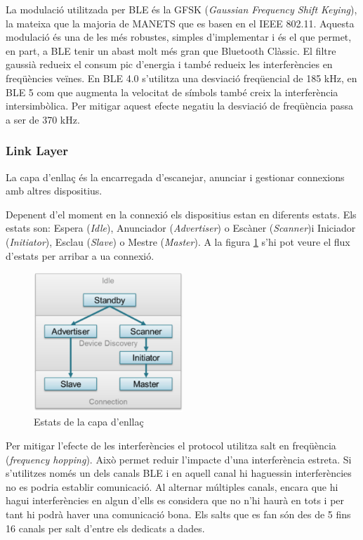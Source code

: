 La modulació utilitzada per BLE és la GFSK (\textit{Gaussian Frequency Shift Keying}), la mateixa que la majoria de MANETS que es basen en el IEEE 802.11.
Aquesta modulació és una de les més robustes, simples d'implementar i és el que permet, en part, a BLE tenir un abast molt més gran que Bluetooth Clàssic.
El filtre gaussià redueix el consum pic d'energia \cite{BLE_Review} i també redueix les interferències en freqüències veïnes.
En BLE 4.0 s'utilitza una desviació freqüencial de 185 kHz, en BLE 5 com que augmenta la velocitat de símbols també creix la interferència intersimbòlica.
Per mitigar aquest efecte negatiu la desviació de freqüència passa a ser de 370 kHz.


\subsubsection{Link Layer}
La capa d'enllaç és la encarregada d'escanejar, anunciar i gestionar connexions amb altres dispositius.

Depenent d'el moment en la connexió els dispositius estan en diferents estats.
Els estats son: Espera (\textit{Idle}), Anunciador (\textit{Advertiser}) o Escàner (\textit{Scanner})i Iniciador (\textit{Initiator}), Esclau (\textit{Slave}) o Mestre (\textit{Master}).
A la figura \ref{Link_State_Diagram} s'hi pot veure el flux d'estats per arribar a ua connexió.

\begin{figure}[!h]
	\begin{center}
		\includegraphics[width=0.5\textwidth]{./images/gap_state_diagram.png}
		\caption{Estats de la capa d'enllaç \cite{Link_Layer_states}}
		\label{Link_State_Diagram}
	\end{center}
\end{figure}

Per mitigar l'efecte de les interferències el protocol utilitza salt en freqüència (\textit{frequency hopping}).
Això permet reduir l'impacte d'una interferència estreta.
Si s'utilitzes només un dels canals BLE i en aquell canal hi haguessin interferències no es podria establir comunicació.
Al alternar múltiples canals, encara que hi hagui interferències en algun d'ells es considera que no n'hi haurà en tots i per tant hi podrà haver una comunicació bona.
Els salts que es fan són des de 5 fins 16 canals per salt d'entre els dedicats a dades.

